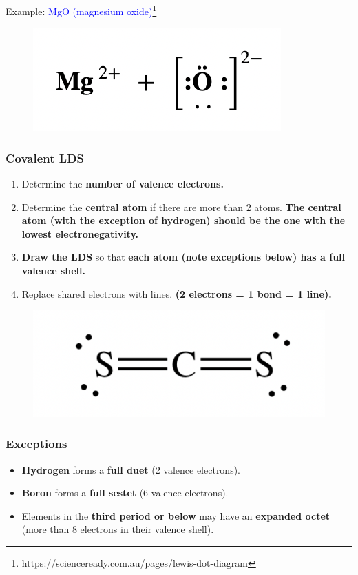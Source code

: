 \documentclass[a4paper, 12pt]{article}
\begin{document}
\noindent Example: \textcolor{blue}{MgO (magnesium oxide)}\footnote{https://scienceready.com.au/pages/lewis-dot-diagram}

\begin{figure}[H]
    \centering
    \includegraphics[width=0.5\linewidth]{ioniclds.png}
    \label{fig:2.5}
\end{figure}

\subsubsection{Covalent LDS}
\begin{enumerate}[leftmargin=*,nosep]
    \item Determine the \textbf{number of valence electrons.}
    \item Determine the \textbf{central atom} if there are more than 2 atoms. \textbf{The central atom (with the exception of hydrogen) should be the one with the lowest electronegativity.}
    \item \textbf{Draw the LDS} so that \textbf{each atom (note exceptions below) has a full valence shell.}
    \item Replace shared electrons with lines. \textbf{(2 electrons = 1 bond = 1 line).}
\end{enumerate}

\begin{figure}[H]
    \centering
    \includegraphics[width=0.3\linewidth]{covalentlds.png}
    \label{fig:3}
\end{figure}

\subsubsection{Exceptions}
\begin{itemize}[leftmargin=*,nosep]
    \item \textbf{Hydrogen} forms a \textbf{full duet} (2 valence electrons).
    \item \textbf{Boron} forms a \textbf{full sestet} (6 valence electrons).
    \item Elements in the \textbf{third period or below} may have an \textbf{expanded octet} (more than 8 electrons in their valence shell).
\end{itemize}
\end{document}
